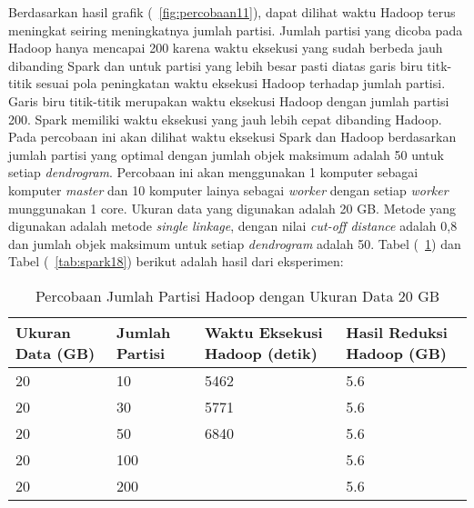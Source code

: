 Berdasarkan hasil grafik (~\ref{fig:percobaan11}), dapat dilihat waktu Hadoop terus meningkat seiring meningkatnya jumlah partisi. Jumlah partisi yang dicoba pada Hadoop hanya mencapai 200 karena waktu eksekusi yang sudah berbeda jauh dibanding Spark dan untuk partisi yang lebih besar pasti diatas garis biru titk-titik sesuai pola peningkatan waktu eksekusi Hadoop terhadap jumlah partisi. Garis biru titik-titik merupakan waktu eksekusi Hadoop dengan jumlah partisi 200. Spark memiliki waktu eksekusi yang jauh lebih cepat dibanding Hadoop.\\




Pada percobaan ini akan dilihat waktu eksekusi Spark dan Hadoop berdasarkan jumlah partisi yang optimal dengan jumlah objek maksimum adalah 50 untuk setiap \textit{dendrogram}. Percobaan ini akan menggunakan 1 komputer sebagai komputer \textit{master} dan 10 komputer lainya sebagai \textit{worker} dengan setiap \textit{worker} munggunakan 1 core. Ukuran data yang digunakan adalah 20 GB. Metode yang digunakan adalah metode \textit{single linkage}, dengan nilai \textit{cut-off distance} adalah 0,8 dan jumlah objek maksimum untuk setiap \textit{dendrogram} adalah 50. Tabel (~\ref{tab:spark17}) dan Tabel (~\ref{tab:spark18}) berikut adalah hasil dari eksperimen:





\begin{table}[H] 
	\centering 
	\caption{Percobaan Jumlah Partisi Hadoop dengan Ukuran Data 20 GB}
	\label{tab:spark17}
	\begin{tabular}{|p{3cm}|p{3cm}|p{4cm}|p{4cm}|}
\hline
Ukuran Data (GB) & Jumlah Partisi &  Waktu Eksekusi Hadoop (detik) & Hasil Reduksi Hadoop (GB)\\
\hline
20 & 10 & 5462  & 5.6  \\
\hline
20 & 30 & 5771  & 5.6  \\
\hline
20 & 50 & 6840  & 5.6  \\
\hline
20 & 100 &   & 5.6  \\
\hline
20 & 200 &   & 5.6  \\
\hline


\hline

	\end{tabular} 
\end{table}





